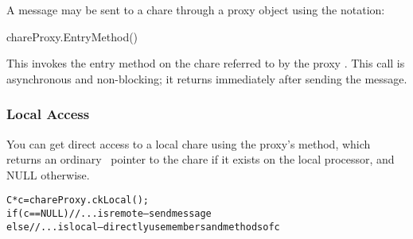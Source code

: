 A message  may be sent to a chare through a proxy
object using the notation:

\begin{tabbing}
chareProxy.EntryMethod()
\end{tabbing}

This invokes the entry method  on the chare referred
to by the proxy . This call
is asynchronous and non-blocking; it returns immediately after sending the
message. 


\subsubsection{Local Access}

You can get direct access to a local chare using the
proxy's  method, which returns an ordinary \CC\ pointer
to the chare if it exists on the local processor, and NULL otherwise.

\begin{alltt}
C *c=chareProxy.ckLocal();
if (c==NULL) //...is remote-- send message
else //...is local-- directly use members and methods of c
\end{alltt}

